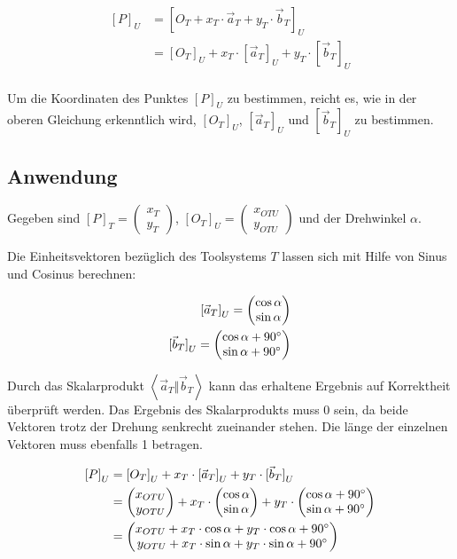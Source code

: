 \documentclass{article}
\newcommand{\m}[1]{\begin{pmatrix}#1\end{pmatrix}}
\begin{document}
    \[
        \begin{split}
            {[P]}_{U} &= {\left [{O}_{T} + {x}_{T} \cdot \vec{a}_T + {y}_{T} \cdot \vec{b}_T \right ]}_{U} \\
            &= {[O_T]}_{U} + x_T \cdot {[\vec{a}_T]}_U + y_T \cdot {[\vec{b}_T]}_U \\
        \end{split}
    \]

    Um die Koordinaten des Punktes ${[P]}_U$ zu bestimmen, reicht es, wie in der oberen Gleichung erkenntlich wird,
    ${[O_T]}_{U}$, ${[\vec{a}_T]}_U$ und ${[\vec{b}_T]}_U$ zu bestimmen.

    \subsection{Anwendung}

    Gegeben sind ${[P]}_T = \m{x_T \\ y_T}$, ${[O_T]}_{U} = \m{x_{OTU} \\ y_{OTU}}$ und der Drehwinkel $\alpha$.
    
    Die Einheitsvektoren bezüglich des Toolsystems $T$ lassen sich mit Hilfe von Sinus und Cosinus berechnen:

    \[
        \begin{split}
            {[\vec{a}_T]}_U = \m{\cos \alpha \\ \sin \alpha} \\
            {[\vec{b}_T]}_U = \m{\cos \alpha + 90 \degree \\ \sin \alpha + 90 \degree} \\
        \end{split}
    \]

    Durch das Skalarprodukt $\left \langle \vec{a}_T \Vert \vec{b}_T \right \rangle$ kann das erhaltene Ergebnis
    auf Korrektheit überprüft werden. Das Ergebnis des Skalarprodukts muss 0 sein, da beide Vektoren trotz der Drehung
    senkrecht zueinander stehen. Die länge der einzelnen Vektoren muss ebenfalls 1 betragen. 

    \[
        \begin{split}
            {[P]}_{U} &= {[O_T]}_{U} + x_T \cdot {[\vec{a}_T]}_U + y_T \cdot {[\vec{b}_T]}_U \\
            &= \m{x_{OTU} \\ y_{OTU}} + x_T \cdot \m{\cos \alpha \\ \sin \alpha} + y_T \cdot \m{\cos \alpha + 90 \degree \\ \sin \alpha + 90 \degree} \\
            &= \m{x_{OTU} + x_T \cdot \cos \alpha + y_T \cdot \cos \alpha + 90 \degree \\ y_{OTU} + x_T \cdot \sin \alpha + y_T \cdot \sin \alpha + 90 \degree} \\
        \end{split}
    \]
\end{document}
